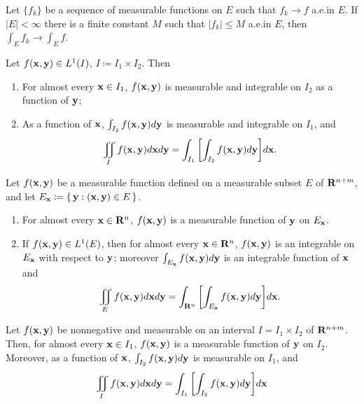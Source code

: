 \begin{corollary*}
Let $\{f_k\}$ be a sequence of measurable functions on $E$ such  that
$f_k\to f$ a.e.\@ in $E$. If $|E|<\infty$ there is a finite constant $M$
such that $|f_k|\leq M$ a.e.\@ in $E$, then $\int_E f_k\to\int_E f$.
\end{corollary*}
\begin{theorem*}
Let $f(\mathbf{x},\mathbf{y})\in L^1(I)$, $I\coloneqq I_1\times I_2$. Then
\begin{enumerate}[label=\textnormal{(\roman*)}]
\item For almost every $\mathbf{x}\in I_1$, $f(\mathbf{x},\mathbf{y})$ is measurable and
  integrable on $I_2$ as a function of $\mathbf{y}$;
\item As a function of $\mathbf{x}$, $\int_{I_2} f(\mathbf{x},\mathbf{y}) d \mathbf{y}$ is
  measurable and integrable on $I_1$, and
\[
\iint_I f(\mathbf{x},\mathbf{y}) d \mathbf{x} d \mathbf{y}=
\int_{I_1}\left[\int_{I_2}f(\mathbf{x},\mathbf{y}) d \mathbf{y}\right]\! d \mathbf{x}.
\]
\end{enumerate}
\end{theorem*}
\begin{theorem*}[6.8]
Let $f(\mathbf{x},\mathbf{y})$ be a measurable function defined on a measurable subset
$E$ of $\mathbf{R}^{n+m}$, and let $E_{\mathbf{x}}\coloneqq\left\{ \,\mathbf{y}:(\mathbf{x},\mathbf{y})\in
  E \,\right\}$.
\begin{enumerate}[label=\textnormal{(\roman*)}]
\item For almost every $\mathbf{x}\in \mathbf{R}^n$, $f(\mathbf{x},\mathbf{y})$ is a measurable
  function of $\mathbf{y}$ on $E_{\mathbf{x}}$.
\item If $f(\mathbf{x},\mathbf{y})\in L^1(E)$, then for almost every $\mathbf{x}\in\mathbf{R}^n$,
  $f(\mathbf{x},\mathbf{y})$ is an integrable on $E_{\mathbf{x}}$ with respect to $\mathbf{y}$;
  moreover $\int_{E_{\mathbf{x}}}f(\mathbf{x},\mathbf{y}) d \mathbf{y}$ is an integrable function
  of $\mathbf{x}$ and
\[
\iint_E f(\mathbf{x},\mathbf{y}) d \mathbf{x} d \mathbf{y}=\int_{\mathbf{R}^n}\left[\int_{E_{\mathbf{x}}}f(\mathbf{x},\mathbf{y}) d \mathbf{y}\right]\! d \mathbf{x}.
\]
\end{enumerate}
\end{theorem*}
\begin{theorem*}
Let $f(\mathbf{x},\mathbf{y})$ be nonnegative and measurable on an interval
$I=I_1\times I_2$ of $\mathbf{R}^{n+m}$. Then, for almost every $\mathbf{x}\in I_1$,
$f(\mathbf{x},\mathbf{y})$ is a measurable function of $\mathbf{y}$ on $I_2$. Moreover, as a
function of $\mathbf{x}$, $\int_{I_2}f(\mathbf{x},\mathbf{y}) d  \mathbf{y}$ is measurable on
$I_1$, and
\[
\iint_I f(\mathbf{x},\mathbf{y}) d \mathbf{x} d \mathbf{y}=\int_{I_1}\left[\int_{I_2}f(\mathbf{x},\mathbf{y}) d \mathbf{y}\right]\! d \mathbf{x}
\]
\end{theorem*}
